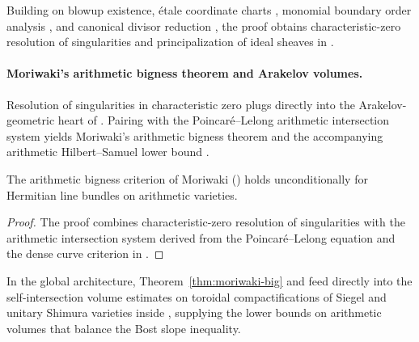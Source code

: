 Building on blowup existence, étale coordinate charts
,
monomial boundary order analysis
,
and canonical divisor reduction
,
the proof obtains characteristic-zero resolution of singularities and
principalization of ideal sheaves in
.

\paragraph{Moriwaki's arithmetic bigness theorem and Arakelov volumes.}
Resolution of singularities in characteristic zero plugs directly into the
Arakelov-geometric heart of . Pairing
 with the Poincaré--Lelong
arithmetic intersection system yields Moriwaki's arithmetic bigness theorem
and the accompanying arithmetic Hilbert--Samuel lower bound
.

\begin{theorem}
\label{thm:moriwaki-big}
The arithmetic bigness criterion of Moriwaki
()
holds unconditionally for Hermitian line bundles on arithmetic varieties.
\end{theorem}

\begin{proof}
The proof combines characteristic-zero resolution of singularities
 with the arithmetic
intersection system derived from the Poincaré--Lelong equation and the dense
curve criterion in
.
\end{proof}

In the global architecture, Theorem~\ref{thm:moriwaki-big} and
 feed
directly into the self-intersection volume estimates on toroidal
compactifications of Siegel and unitary Shimura varieties inside
,
supplying the lower bounds on arithmetic volumes that balance the Bost slope
inequality.

